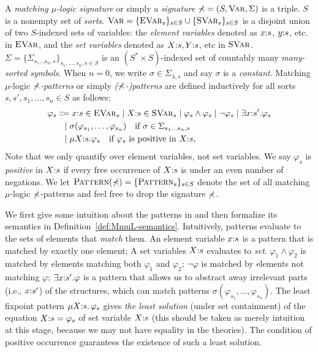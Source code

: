 \documentclass{almostllncs}
\begin{document}
\begin{definition} \label{def:MmuL-syntax}

A \emph{matching $\mu$-logic signature} or simply a \emph{signature}
$\mathbb{\Sigma} = (S, {\normalfont\textsc{Var}}, \Sigma)$ is a triple.
$S$ is a nonempty set of \emph{sorts}.
${\normalfont\textsc{Var}} = \{ {\normalfont\textsc{EVar}}_s \}_{s \in S} \cup \{ {\normalfont\textsc{SVar}}_s \}_{s \in S}$ is a disjoint union of two $S$-indexed sets of variables:
the \emph{element variables} denoted as $x \mathord{:} s$, $y \mathord{:} s$, etc.
in ${\normalfont\textsc{EVar}}$, and
the \emph{set variables} denoted as $X \mathord{:} s, Y \mathord{:} s$, etc
in ${\normalfont\textsc{SVar}}$.
$\Sigma = \{ \Sigma_{s_1 \dots s_n , s} \}_{s_1,\dots,s_n,s \in S}$ is an $(S^* \times S)$-indexed set of countably many \emph{many-sorted symbols}.
When $n = 0$, we write $\sigma \in \Sigma_{\lambda,s}$ and say $\sigma$ is a \emph{constant}.
Matching $\mu$-logic \emph{$\mathbb{\Sigma}$-patterns}
or simply \emph{($\mathbb{\Sigma}$-)patterns}
are defined inductively for all sorts
$s, s',s_1,\dots,s_n\in S$ as follows:
\begin{align*}
\varphi_s 
& \Coloneqq 
x \mathord{:} s \in {\normalfont\textsc{EVar}}_s \mid
X \mathord{:} s \in {\normalfont\textsc{SVar}}_s \mid
\varphi_s \wedge \varphi_s \mid
\neg \varphi_s \mid
\exists x \mathord{:} s' \mathord{.} \varphi_s \\
& \ \  \mid
\sigma(\varphi_{s_1},\dots,\varphi_{s_n})
\quad \text{if $\sigma \in \Sigma_{s_1\dots s_n , s}$} \\
& \ \  \mid
\mu X \mathord{:} s \mathord{.} \varphi_s
\quad \text{if $\varphi_s$ is positive in $X \mathord{:} s$},
\end{align*}
\noindent
Note that we only quantify over element variables, not set variables.
We say $\varphi_s$ is \emph{positive} in $X \mathord{:} s$ if
every free occurrence of $X \mathord{:} s$ is under an even number of negations.
We let ${\normalfont\textsc{Pattern}}(\mathbb{\Sigma}) = \{ {\normalfont\textsc{Pattern}}_s \}_{s \in S}$ denote the set of
all matching $\mu$-logic $\mathbb{\Sigma}$-patterns and feel free
to drop the signature $\mathbb{\Sigma}$.

\end{definition}

We first give some intuition about the patterns in \mmul and then formalize its semantics in Definition~\ref{def:MmuL-semantics}.
Intuitively, patterns evaluate to the sets of elements that \emph{match} them.
An element variable $x \mathord{:} s$ is a pattern that is matched by exactly one element;
A set variables $X \mathord{:} s$ evaluates to \emph{set}.
$\varphi_1 \wedge \varphi_2$ is matched by elements
matching both $\varphi_1$ and $\varphi_2$;
$\neg \varphi$ is matched by elements not matching $\varphi$;
$\exists x \mathord{:} s' \mathord{.} \varphi$ is a pattern that allows us to
abstract away irrelevant parts (i.e., $x \mathord{:} s'$) of the
structures, which can match patterns 
$\sigma(\varphi_{s_1},\dots,\varphi_{s_n})$.
The least fixpoint pattern $\mu X \mathord{:} s \mathord{.}\, \varphi_s$ gives
\emph{the least solution} (under set containment) of the equation 
$X \mathord{:} s = \varphi_s$ of set variable $X \mathord{:} s$
(this should be taken as merely intuition at this stage, because we may not 
have equality in the theories).
The condition of positive occurrence guarantees the existence of such a least solution.
\end{document}
